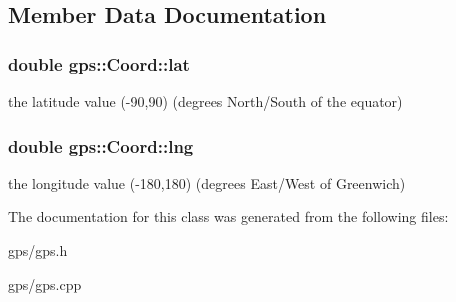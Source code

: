 \subsection{Member Data Documentation}
\subsubsection[{\texorpdfstring{lat}{lat}}]{\setlength{\rightskip}{0pt plus 5cm}double gps\+::\+Coord\+::lat}\hypertarget{classgps_1_1Coord_a17cbbd7580a83c42f650b8f93e14d98e}{}\label{classgps_1_1Coord_a17cbbd7580a83c42f650b8f93e14d98e}
the latitude value (-\/90,90) (degrees North/\+South of the equator) 
\subsubsection[{\texorpdfstring{lng}{lng}}]{\setlength{\rightskip}{0pt plus 5cm}double gps\+::\+Coord\+::lng}\hypertarget{classgps_1_1Coord_abca98aaabe2dc3cf50ebdd687c2f47e8}{}\label{classgps_1_1Coord_abca98aaabe2dc3cf50ebdd687c2f47e8}
the longitude value (-\/180,180) (degrees East/\+West of Greenwich) 

The documentation for this class was generated from the following files\+:\begin{DoxyCompactItemize}
\item 
gps/gps.\+h\item 
gps/gps.\+cpp\end{DoxyCompactItemize}
